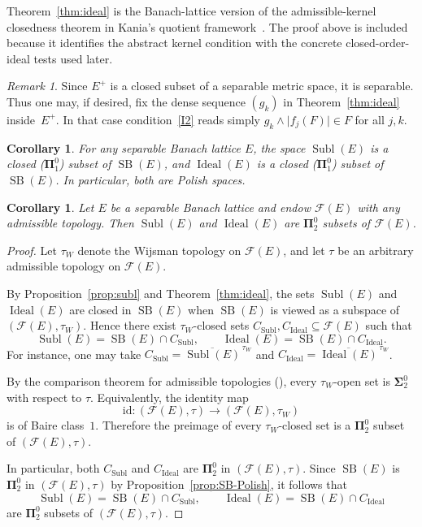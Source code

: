 \documentclass[12pt]{amsart}
\theoremstyle{plain}
\newtheorem{corollary}[theorem]{Corollary}
\theoremstyle{definition}
\theoremstyle{remark}
\newtheorem{remark}[theorem]{Remark}
\DeclareMathOperator{\SB}{SB}
\DeclareMathOperator{\Subl}{Subl}
\DeclareMathOperator{\Ideal}{Ideal}
\begin{document}
Theorem~\ref{thm:ideal} is the Banach-lattice version of the admissible-kernel
closedness theorem in Kania's quotient framework~\cite[Proposition~3.6]{Kan2026Pol}.
The proof above is included because it identifies the abstract kernel condition
with the concrete closed-order-ideal tests used later.

\begin{remark}\label{rem:positive-dense}
Since $E^+$ is a closed subset of a separable metric space, it is separable.
Thus one may, if desired, fix the dense sequence $(g_k)$ in
Theorem~\ref{thm:ideal} inside~$E^+$.  In that case condition~\ref{I2} reads
simply $g_k \wedge \lvert f_j(F) \rvert \in F$ for all $j, k$.
\end{remark}

\begin{corollary}\label{cor:coding-Polish}
For any separable Banach lattice $E$, the space $\Subl(E)$ is a closed
($\boldsymbol{\Pi}^0_1$) subset of $\SB(E)$, and $\Ideal(E)$ is a closed
($\boldsymbol{\Pi}^0_1$) subset of $\SB(E)$.  In particular, both are
Polish spaces.
\end{corollary}

\begin{corollary}\label{cor:ambient-complexity}
Let $E$ be a separable Banach lattice and endow $\mathcal{F}(E)$ with any
admissible topology.  Then $\Subl(E)$ and $\Ideal(E)$ are
$\boldsymbol{\Pi}^0_2$ subsets of $\mathcal{F}(E)$.
\end{corollary}

\begin{proof}
Let $\tau_W$ denote the Wijsman topology on $\mathcal{F}(E)$, and let $\tau$
be an arbitrary admissible topology on $\mathcal{F}(E)$.

By Proposition~\ref{prop:subl} and Theorem~\ref{thm:ideal}, the sets
$\Subl(E)$ and $\Ideal(E)$ are closed in $\SB(E)$ when $\SB(E)$ is viewed as a
subspace of $(\mathcal{F}(E),\tau_W)$.  Hence there exist $\tau_W$-closed sets
$C_{\Subl}, C_{\Ideal} \subseteq \mathcal{F}(E)$ such that
\[
    \Subl(E)=\SB(E)\cap C_{\Subl},
    \qquad
    \Ideal(E)=\SB(E)\cap C_{\Ideal}.
\]
For instance, one may take
$C_{\Subl}=\overline{\Subl(E)}^{\,\tau_W}$ and
$C_{\Ideal}=\overline{\Ideal(E)}^{\,\tau_W}$.

By the comparison theorem for admissible topologies
(\cite[Section~2]{God2018Cod}), every $\tau_W$-open set is
$\boldsymbol{\Sigma}^0_2$ with respect to $\tau$.  Equivalently, the identity
map
\[
    \mathrm{id}\colon (\mathcal{F}(E),\tau)\longrightarrow
    (\mathcal{F}(E),\tau_W)
\]
is of Baire class~$1$.  Therefore the preimage of every $\tau_W$-closed set is
a $\boldsymbol{\Pi}^0_2$ subset of $(\mathcal{F}(E),\tau)$.

In particular, both $C_{\Subl}$ and $C_{\Ideal}$ are
$\boldsymbol{\Pi}^0_2$ in $(\mathcal{F}(E),\tau)$.  Since $\SB(E)$ is
$\boldsymbol{\Pi}^0_2$ in $(\mathcal{F}(E),\tau)$ by
Proposition~\ref{prop:SB-Polish}, it follows that
\[
    \Subl(E)=\SB(E)\cap C_{\Subl},
    \qquad
    \Ideal(E)=\SB(E)\cap C_{\Ideal}
\]
are $\boldsymbol{\Pi}^0_2$ subsets of $(\mathcal{F}(E),\tau)$.
\end{proof}
\end{document}
